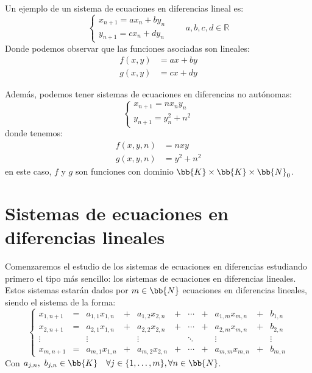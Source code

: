 \begin{ejemplo}
    Un ejemplo de un sistema de ecuaciones en diferencias lineal es:
    \begin{equation*}
        \left\{\begin{array}{l}
                x_{n+1} = ax_n + by_n \\
                y_{n+1} = cx_n + dy_n 
        \end{array}\right. \qquad a,b,c,d \in \mathbb{R}
    \end{equation*}
    Donde podemos observar que las funciones asociadas 
    son lineales:
    \begin{align*}
        f(x,y) &= ax + by \\
        g(x,y) &= cx + dy
    \end{align*}
\end{ejemplo}

\begin{ejemplo}
    Además, podemos tener sistemas de ecuaciones en diferencias no autónomas:
    \begin{equation*}
        \left\{\begin{array}{l}
                x_{n+1} = n x_n y_n \\
                y_{n+1} = y_n^2 + n^2
        \end{array}\right.
    \end{equation*}
    donde tenemos:
    \begin{align*}
        f(x,y,n) &= nxy \\
        g(x,y,n) &= y^2 + n^2
    \end{align*}
    en este caso, $f$ y $g$ son funciones con dominio $\bb{K}\times \bb{K}\times\bb{N}_0$.
\end{ejemplo}


\section{Sistemas de ecuaciones en diferencias lineales}
Comenzaremos el estudio de los sistemas de ecuaciones en diferencias estudiando primero el tipo más sencillo: los sistemas de ecuaciones en diferencias lineales.
Estos sistemas estarán dados por $m\in \bb{N}$ ecuaciones en diferencias lineales, siendo el sistema de la forma:
\begin{equation}\label{eq:sistema_eq_dif_lineal}
    \left\{ \begin{array}{ccccccccccc}
        x_{1,n+1} & = & a_{1, 1} x_{1, n} & + & a_{1, 2} x_{2, n} & + & \cdots & + & a_{1,m} x_{m,n} & + & b_{1,n} \\
        x_{2,n+1} & = & a_{2, 1} x_{1, n} & + & a_{2, 2} x_{2, n} & + & \cdots & + & a_{2,m} x_{m,n} & + & b_{2,n} \\
        \vdots &  & \vdots &  & \vdots &  & \ddots &  & \vdots &  & \vdots \\
        x_{m, n+1} & = & a_{m, 1} x_{1, n} & + & a_{m, 2} x_{2, n} & + & \cdots & + & a_{m, m} x_{m, n} & + & b_{m,n}
    \end{array}\right. 
\end{equation}
Con $a_{j,n},~b_{j,n} \in \bb{K} \quad \forall j \in \{1, \ldots, m\},\forall n\in \bb{N}$.\\

